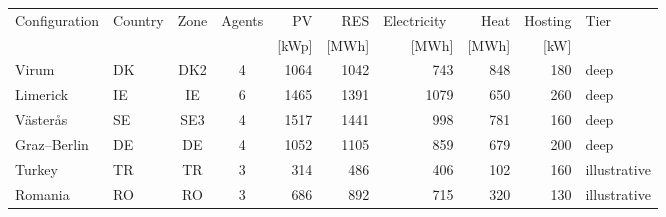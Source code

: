 \begin{tabular}{llccrrrrrl}
\toprule
Configuration & Country & Zone & Agents & PV & RES & Electricity\ & Heat & Hosting & Tier \\
 & & & & [kWp] & [MWh] & [MWh] & [MWh] & [kW] & \\
\midrule
Virum & DK & DK2 & 4 & 1064 & 1042 & 743 & 848 & 180 & deep \\
Limerick & IE & IE & 6 & 1465 & 1391 & 1079 & 650 & 260 & deep \\
V\"aster\aa s & SE & SE3 & 4 & 1517 & 1441 & 998 & 781 & 160 & deep \\
Graz--Berlin & DE & DE & 4 & 1052 & 1105 & 859 & 679 & 200 & deep \\
Turkey & TR & TR & 3 & 314 & 486 & 406 & 102 & 160 & illustrative \\
Romania & RO & RO & 3 & 686 & 892 & 715 & 320 & 130 & illustrative \\
\bottomrule
\end{tabular}
